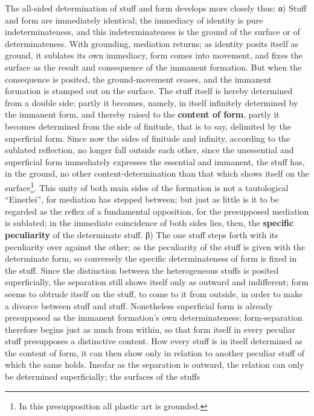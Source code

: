 \documentclass[12pt,a4paper,openany]{book}
\newcommand{\opage}[1]{\marginnote{\footnotesize\textit{[#1]}}}
\begin{document}
The all-sided determination of stuff and form develops
more closely thus: α) Stuff and form are immediately
identical; the immediacy of identity is pure
indeterminateness, and this indeterminateness is the ground of the surface or
of determinateness. With grounding, mediation
returns; as identity posits itself as ground,
it sublates its own immediacy, form comes
into movement, and fixes the surface as the result and consequence
of the immanent formation. But when the consequence is
posited, the ground-movement ceases, and the immanent formation
is stamped out on the surface. The stuff itself is hereby determined
from a double side: partly it becomes, namely,
in itself infinitely determined by the immanent
form, and thereby raised to the \textbf{content of form}, partly
it becomes determined from the side of finitude, that is to say,
delimited by the superficial form. Since now the sides of finitude
and infinity, according to the sublated
reflection, no longer fall outside each other, since the
unessential and superficial form immediately expresses
the essential and immanent, the stuff has, in the ground,
no other content-determination than that which shows
itself on the surface\footnote{In this presupposition all plastic art is grounded.}. This unity of both main sides of the formation
is not a tautological ``Einerlei'',
for mediation has stepped between; but just as little
is it to be regarded as the reflex of a fundamental opposition,
for the presupposed mediation is sublated; in the immediate coincidence of both
\setcounter{footnote}{0}%
\opage{151}sides lies, then, the \textbf{specific peculiarity} of the determinate
stuff. β) The
one stuff steps forth with its peculiarity over against
the other; as the peculiarity of the stuff is given with
the determinate form, so conversely the specific
determinateness of form is fixed in the stuff. Since the distinction between
the heterogeneous stuffs is posited superficially, the separation
still shows itself only as outward and indifferent; form
seems to obtrude itself on the stuff, to come to it from outside,
in order to make a divorce between stuff and stuff. Nonetheless
superficial form is already presupposed as
the immanent formation's own determinateness; form-separation
therefore begins just as much from within, so that
form itself in every peculiar stuff presupposes
a distinctive content. How every stuff is in itself
determined as the content of form, it can then show only
in relation to another peculiar stuff of which
the same holds. Insofar as the separation is outward,
the relation can only be determined superficially; the surfaces of the stuffs
\end{document}
